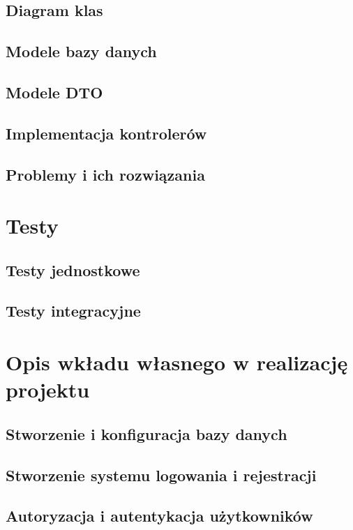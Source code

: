 \documentclass[12pt,a4paper]{article}
\begin{document}
\subsection{Diagram klas}					%
\subsection{Modele bazy danych}				%
\subsection{Modele DTO} 					%
\subsection{Implementacja kontrolerów}		%
\subsection{Problemy i ich rozwiązania}		%

\section{Testy}

\subsection{Testy jednostkowe}   %
\subsection{Testy integracyjne}  %

\section{Opis wkładu własnego w realizację projektu}

\subsection{Stworzenie i konfiguracja bazy danych}
\subsection{Stworzenie systemu logowania i rejestracji}
\subsection{Autoryzacja i autentykacja użytkowników}
\end{document}
